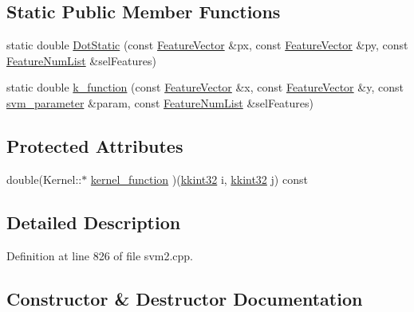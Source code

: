 \subsection*{Static Public Member Functions}
\begin{DoxyCompactItemize}
\item 
static double \hyperlink{class_s_v_m289___m_f_s_1_1_kernel_ac6cff2a2950b9b39f7afe822787f4e4b}{Dot\+Static} (const \hyperlink{class_k_k_m_l_l_1_1_feature_vector}{Feature\+Vector} \&px, const \hyperlink{class_k_k_m_l_l_1_1_feature_vector}{Feature\+Vector} \&py, const \hyperlink{class_k_k_m_l_l_1_1_feature_num_list}{Feature\+Num\+List} \&sel\+Features)
\item 
static double \hyperlink{class_s_v_m289___m_f_s_1_1_kernel_a6bf230884055cca83b2bcb088f6a8676}{k\+\_\+function} (const \hyperlink{class_k_k_m_l_l_1_1_feature_vector}{Feature\+Vector} \&x, const \hyperlink{class_k_k_m_l_l_1_1_feature_vector}{Feature\+Vector} \&y, const \hyperlink{struct_s_v_m289___m_f_s_1_1svm__parameter}{svm\+\_\+parameter} \&param, const \hyperlink{class_k_k_m_l_l_1_1_feature_num_list}{Feature\+Num\+List} \&sel\+Features)
\end{DoxyCompactItemize}
\subsection*{Protected Attributes}
\begin{DoxyCompactItemize}
\item 
double(Kernel\+::$\ast$ \hyperlink{class_s_v_m289___m_f_s_1_1_kernel_aeefe3098d1eb72604d8d9d82c385e7bd}{kernel\+\_\+function} )(\hyperlink{namespace_k_k_b_a8fa4952cc84fda1de4bec1fbdd8d5b1b}{kkint32} i, \hyperlink{namespace_k_k_b_a8fa4952cc84fda1de4bec1fbdd8d5b1b}{kkint32} j) const 
\end{DoxyCompactItemize}


\subsection{Detailed Description}


Definition at line 826 of file svm2.\+cpp.



\subsection{Constructor \& Destructor Documentation}
